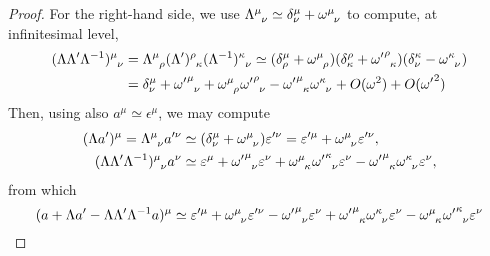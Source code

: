 \begin{mdframed}
\begin{proof}
    For the right-hand side, we use $\tensor{\Lambda}{^\mu_\nu} \simeq \delta^\mu_\nu + \tensor{\omega}{^\mu_\nu}$ to compute, at infinitesimal level,
    \begin{align*}
        \tensor{(\Lambda\Lambda'\Lambda^{-1})}{^\mu_\nu} &= \tensor{\Lambda}{^\mu_\rho}\tensor{(\Lambda')}{^\rho_\kappa}\tensor{(\Lambda^{-1})}{^\kappa_\nu} \simeq (\delta^\mu_\rho + \tensor{\omega}{^\mu_\rho})(\delta^\rho_\kappa + \tensor{{\omega'}}{^\rho_\kappa})(\delta^\kappa_\nu - \tensor{\omega}{^\kappa_\nu}) \\
        &= \delta^\mu_\nu + \tensor{{\omega'}}{^\mu_\nu} + \tensor{\omega}{^\mu_\rho}\tensor{{\omega'}}{^\rho_\nu} - \tensor{{\omega'}}{^\mu_\kappa}\tensor{\omega}{^\kappa_\nu} + O(\omega^2) + O({\omega'}^2)
    \end{align*}
    Then, using also $a^\mu \simeq \epsilon^\mu$, we may compute
    \begin{align*}
        (\Lambda a')^\mu = \tensor{\Lambda}{^\mu_\nu} a'^\nu &\simeq (\delta^\mu_\nu + \tensor{\omega}{^\mu_\nu}) \epsilon'^\nu = \epsilon'^\mu + \tensor{\omega}{^\mu_\nu} \epsilon'^\nu , \\
        \tensor{(\Lambda\Lambda'\Lambda^{-1})}{^\mu_\nu} a^\nu &\simeq \epsilon^\mu + \tensor{{\omega'}}{^\mu_\nu} \epsilon^\nu + \tensor{\omega}{^\mu_\kappa}\tensor{{\omega'}}{^\kappa_\nu} \epsilon^\nu - \tensor{{\omega'}}{^\mu_\kappa}\tensor{\omega}{^\kappa_\nu} \epsilon^\nu ,
    \end{align*}
    from which
    \begin{equation*}
        (a + \Lambda a' - \Lambda \Lambda' \Lambda^{-1}a)^\mu \simeq \epsilon'^\mu + \tensor{\omega}{^\mu_\nu} \epsilon'^\nu - \tensor{{\omega'}}{^\mu_\nu} \epsilon^\nu + \tensor{{\omega'}}{^\mu_\kappa}\tensor{\omega}{^\kappa_\nu} \epsilon^\nu - \tensor{\omega}{^\mu_\kappa}\tensor{{\omega'}}{^\kappa_\nu} \epsilon^\nu
    \end{equation*}


\end{proof}
\end{mdframed}
